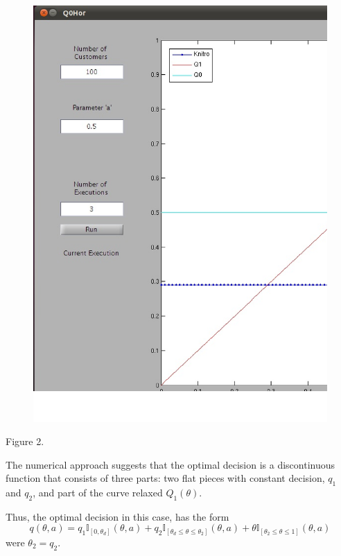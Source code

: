 \begin{itemize}
\begin{center}
\begin{figure}[h!]
\includegraphics[scale=0.2]{knitrohor.eps} 
\end{figure}
Figure 2.
\end{center}


The numerical approach suggests that the optimal decision is a discontinuous function that consists of three parts: two flat pieces with constant decision, $q_1$ and $q_2$,
 and part of the curve relaxed $Q_{1}(\theta)$.

Thus, the optimal decision in this case, has the form $$q(\theta,a)=q_1\mathbb{I}_{[0,\theta_{d}]}(\theta,a) + q_2\mathbb{I}_{[\theta_{d}\leq \theta \leq \theta_{2}]}(\theta,a) + \theta \mathbb{I}_{[\theta_{2}\leq \theta \leq 1]}(\theta,a)$$
were $\theta_{2}=q_{2}$.\\


\end{itemize}
